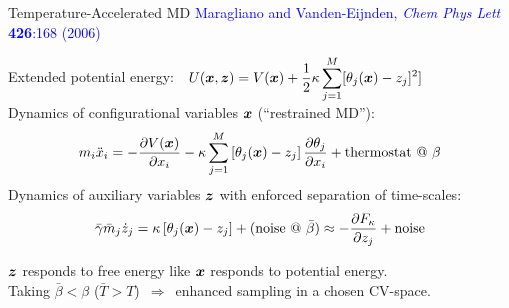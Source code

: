 \documentclass[10pt]{beamer}
\begin{document}
\begin{frame}[fragile]{Temperature-Accelerated MD}
\vspace{-5mm}
\textcolor{blue}{\tiny Maragliano and Vanden-Eijnden, {\it Chem Phys Lett} {\bf 
426}:168 (2006)}

Extended potential energy:\ \ $\displaystyle U({\boldsymbol x},{\boldsymbol z}) = V({\boldsymbol x}) + 
\frac{1}{2}\kappa\sum_{j=1}^{M}[\theta_j({\boldsymbol x})-z_j]^2]$\\
Dynamics of configurational variables ${\boldsymbol x}$ (``restrained MD''):
\begin{displaymath}
m_i\ddot{x}_i = -\frac{\partial V({\boldsymbol x})}{\partial 
x_i}-\kappa\sum_{j=1}^{M}\left[\theta_j({\boldsymbol x})-z_j\right]\frac{\partial\theta_j}{
\partial x_i}+\mbox{thermostat @ $\beta$}
\end{displaymath}
Dynamics of auxiliary variables ${\boldsymbol z}$ with enforced separation of time-scales:
\begin{displaymath}
\bar\gamma\bar{m}_j\dot{z}_j = \kappa\left[\theta_j({\boldsymbol x})-z_j\right] + 
(\mbox{noise @ $\bar\beta$}) \approx -\frac{\partial F_{\kappa}}{\partial z_j} + 
\mbox{noise}
\end{displaymath}

${\boldsymbol z}$ responds to free energy like ${\boldsymbol x}$ responds to potential energy.\\
Taking $\bar\beta < \beta$ ($\bar{T} > T$)\ $\Rightarrow$\ enhanced sampling in 
a chosen CV-space.

\end{frame}
\end{document}
